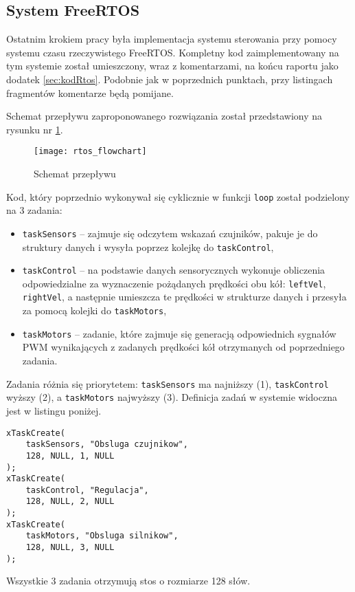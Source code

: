 \documentclass[11pt]{article}
\begin{document}
\subsection{System FreeRTOS}
Ostatnim krokiem pracy była implementacja systemu sterowania przy pomocy systemu czasu rzeczywistego FreeRTOS.
Kompletny kod zaimplementowany na tym systemie został umieszczony, wraz z komentarzami, na końcu raportu jako dodatek \ref{sec:kodRtos}. Podobnie jak w poprzednich punktach, przy listingach fragmentów komentarze będą pomijane.

Schemat przepływu zaproponowanego rozwiązania został przedstawiony na rysunku nr \ref{fig:rtos}.

\begin{figure}[htbp!]
	\centering
	\texttt{[image: rtos\_flowchart]}
	\caption{Schemat przepływu \label{fig:rtos}}
\end{figure}

Kod, który poprzednio wykonywał się cyklicznie w funkcji \texttt{loop} został podzielony na 3 zadania:
\begin{itemize}
\item \texttt{taskSensors} -- zajmuje się odczytem wskazań czujników, pakuje je do struktury danych i wysyła poprzez kolejkę do \texttt{taskControl},
\item \texttt{taskControl} -- na podstawie danych sensorycznych wykonuje obliczenia odpowiedzialne za wyznaczenie pożądanych prędkości obu kół: \texttt{leftVel}, \texttt{rightVel}, a następnie umieszcza te prędkości w strukturze danych i przesyła za pomocą kolejki do \texttt{taskMotors},
\item \texttt{taskMotors} -- zadanie, które zajmuje się generacją odpowiednich sygnałów PWM wynikających z zadanych prędkości kół otrzymanych od poprzedniego zadania.
\end{itemize}

Zadania różnia się priorytetem: \texttt{taskSensors} ma najniższy (1), \texttt{taskControl} wyższy (2), a \texttt{taskMotors} najwyższy (3). Definicja zadań w systemie widoczna jest w listingu poniżej.
\begin{lstlisting}[firstnumber = 43]
xTaskCreate(
	taskSensors, "Obsluga czujnikow",
	128, NULL, 1, NULL
);
xTaskCreate(
	taskControl, "Regulacja",
	128, NULL, 2, NULL
);
xTaskCreate(
	taskMotors, "Obsluga silnikow",
	128, NULL, 3, NULL
);
\end{lstlisting}

Wszystkie 3 zadania otrzymują stos o rozmiarze 128 słów.
\end{document}
